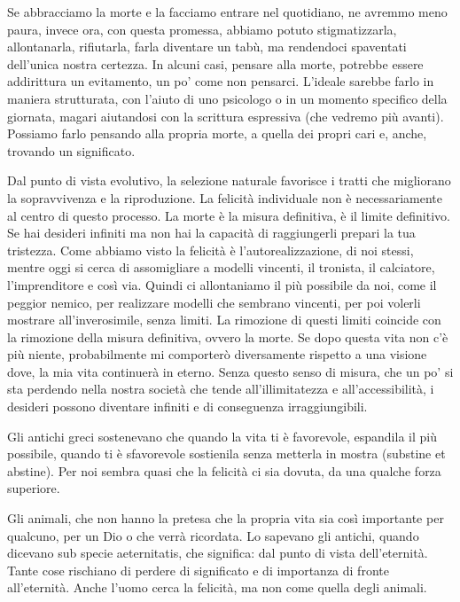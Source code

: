 \documentclass[12pt]{book} %
\begin{document}
Se abbracciamo la morte e la facciamo
entrare nel quotidiano, ne avremmo meno paura, invece ora, con questa promessa, abbiamo potuto stigmatizzarla,
allontanarla, rifiutarla, farla diventare un tabù, ma rendendoci spaventati dell'unica nostra
certezza.
In alcuni casi, pensare alla morte, potrebbe essere addirittura un evitamento, un po' come non pensarci.
L'ideale sarebbe farlo in maniera strutturata, con l'aiuto di uno psicologo o in un momento specifico della giornata, magari aiutandosi con la scrittura espressiva (che vedremo più avanti). Possiamo farlo pensando alla propria morte, a quella dei propri cari e, anche, trovando un significato.

Dal punto di vista evolutivo, la selezione naturale favorisce i tratti che migliorano la sopravvivenza e la riproduzione. La felicità individuale non è necessariamente al centro di questo processo. La morte è la misura definitiva, è il limite
definitivo. Se hai desideri infiniti ma non hai la capacità di raggiungerli prepari la tua tristezza. Come abbiamo
visto la felicità è l'autorealizzazione, di noi stessi, mentre oggi si cerca di assomigliare a
modelli vincenti, il tronista, il calciatore, l'imprenditore e così via. Quindi ci allontaniamo il
più possibile da noi, come il peggior nemico, per realizzare modelli che sembrano vincenti, per poi volerli mostrare
all'inverosimile, senza limiti. La rimozione di questi limiti coincide con la rimozione della misura definitiva, ovvero
la morte. Se dopo questa vita non c'è più niente, probabilmente mi comporterò diversamente rispetto a una
visione dove, la mia vita continuerà in eterno. Senza questo senso di misura, che un po' si sta perdendo nella nostra società che tende all'illimitatezza e all'accessibilità, i desideri possono diventare infiniti e di conseguenza irraggiungibili.

Gli antichi greci sostenevano che quando la vita ti è favorevole, espandila il più possibile, quando ti è sfavorevole
sostienila senza metterla in mostra (substine et abstine). Per noi sembra quasi che la felicità ci sia dovuta, da una
qualche forza superiore.

Gli animali, che non hanno la pretesa che la propria vita sia così importante per qualcuno, per un Dio o che verrà
ricordata. Lo sapevano gli
antichi, quando dicevano sub specie aeternitatis, che significa: dal punto di vista dell'eternità. Tante cose rischiano di perdere di
significato e di importanza di fronte all'eternità. Anche l'uomo cerca la felicità, ma non come quella degli animali.
\end{document}
